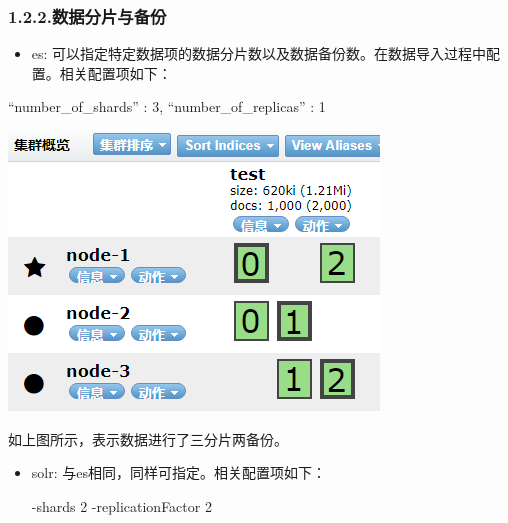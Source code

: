 \documentclass{article}
\begin{document}
\subsubsection{1.2.2.\hspace*{0.5em}数据分片与备份}\label{section}%

\begin{itemize}[noitemsep,topsep=\mdcompacttopsep]%

\item{}es: 可以指定特定数据项的数据分片数以及数据备份数。在数据导入过程中配置。相关配置项如下：     %
\end{itemize}%

\begin{mdcenter}%

\noindent{}\textquotedblleft{}number\_of\_shards\textquotedblright{} : 3,     \mdbr
{}\textquotedblleft{}number\_of\_replicas\textquotedblright{} : 1%
\end{mdcenter}%

\begin{mdcenter}%

\noindent{}\includegraphics[keepaspectratio=true,width=\dimmin{}{\dimwidth{0.90}}]{images/test}{}%
\end{mdcenter}%

\noindent{}如上图所示，表示数据进行了三分片两备份。%

\begin{itemize}[noitemsep,topsep=\mdcompacttopsep]%

\item{}solr: 与es相同，同样可指定。相关配置项如下：      

\begin{mdcenter}%

\noindent{}-shards 2 -replicationFactor 2%
\end{mdcenter}%
\end{itemize}%
\end{document}
